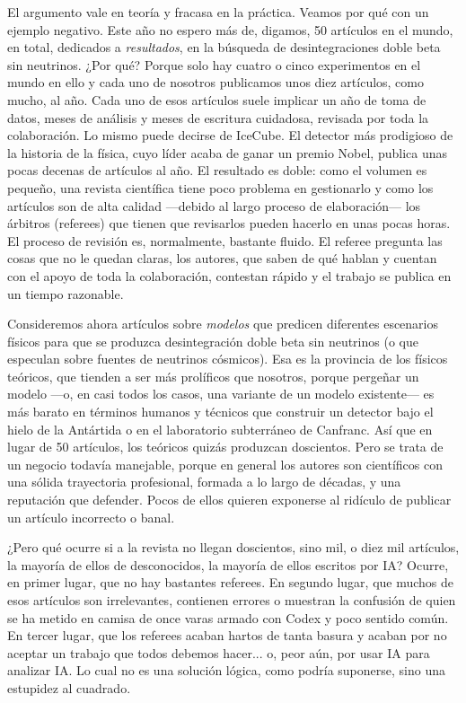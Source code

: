 \documentclass[11pt,a4paper]{article}
\begin{document}
El argumento vale en teoría y fracasa en la práctica. Veamos por qué con un ejemplo negativo. Este año no espero más de, digamos, 50 artículos en el mundo, en total, dedicados a \emph{resultados}, en la búsqueda de desintegraciones doble beta sin neutrinos. ¿Por qué? Porque solo hay cuatro o cinco experimentos en el mundo en ello y cada uno de nosotros publicamos unos diez artículos, como mucho, al año. Cada uno de esos artículos suele implicar un año de toma de datos, meses de análisis y meses de escritura cuidadosa, revisada por toda la colaboración. Lo mismo puede decirse de IceCube. El detector más prodigioso de la historia de la física, cuyo líder acaba de ganar un premio Nobel, publica unas pocas decenas de artículos al año. El resultado es doble: como el volumen es pequeño, una revista científica tiene poco problema en gestionarlo y como los artículos son de alta calidad ---debido al largo proceso de elaboración--- los árbitros (referees) que tienen que revisarlos pueden hacerlo en unas pocas horas. El proceso de revisión es, normalmente, bastante fluido. El referee pregunta las cosas que no le quedan claras, los autores, que saben de qué hablan y cuentan con el apoyo de toda la colaboración, contestan rápido y el trabajo se publica en un tiempo razonable.

Consideremos ahora artículos sobre \emph{modelos} que predicen diferentes escenarios físicos para que se produzca desintegración doble beta sin neutrinos (o que especulan sobre fuentes de neutrinos cósmicos). Esa es la provincia de los físicos teóricos, que tienden a ser más prolíficos que nosotros, porque pergeñar un modelo ---o, en casi todos los casos, una variante de un modelo existente--- es más barato en términos humanos y técnicos que construir un detector bajo el hielo de la Antártida o en el laboratorio subterráneo de Canfranc. Así que en lugar de 50 artículos, los teóricos quizás produzcan doscientos. Pero se trata de un negocio todavía manejable, porque en general los autores son científicos con una sólida trayectoria profesional, formada a lo largo de décadas, y una reputación que defender. Pocos de ellos quieren exponerse al ridículo de publicar un artículo incorrecto o banal. 

¿Pero qué ocurre si a la revista no llegan doscientos, sino mil, o diez mil artículos, la mayoría de ellos de desconocidos, la mayoría de ellos escritos por IA? Ocurre, en primer lugar, que no hay bastantes referees. En segundo lugar, que muchos de esos artículos son irrelevantes, contienen errores o muestran la confusión de quien se ha metido en camisa de once varas armado con Codex y poco sentido común. En tercer lugar, que los referees acaban hartos de tanta basura y acaban por no aceptar un trabajo que todos debemos hacer... o, peor aún, por usar IA para analizar IA. Lo cual no es una solución lógica, como podría suponerse, sino una estupidez al cuadrado.
\end{document}
